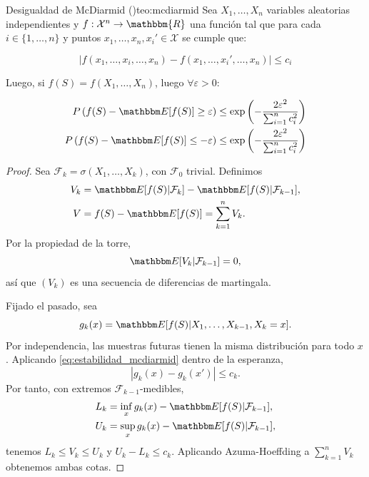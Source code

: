 \begin{theorem}{Desigualdad de McDiarmid (\cite{mcdiarmid1989method})}{teo:mcdiarmid}
	Sea \(X_1, \ldots, X_n\) variables aleatorias independientes y \(f: \mathcal{X}^n \to \mathbbm{R}\) una función tal que para cada \(i \in \{1, \ldots, n\}\) y
	puntos \(x_1, \ldots, x_n, x_i' \in \mathcal{X}\) se cumple que:

	\begin{equation}\label{eq:estabilidad_mcdiarmid}
		\left| f(x_1, \ldots, x_i, \ldots, x_n) - f(x_1, \ldots, x_i', \ldots, x_n) \right| \leq c_i
	\end{equation}

	Luego, si \(f(S) = f(X_1, \ldots, X_n)\), luego \(\forall \varepsilon > 0\):

	\begin{align}
		P\left( f(S) - \E{f(S)} \geq \varepsilon \right)  & \leq \exp\left( -\frac{2\varepsilon^2}{\sum_{i=1}^n c_i^2} \right) \\
		P\left( f(S) - \E{f(S)} \leq -\varepsilon \right) & \leq \exp\left( -\frac{2\varepsilon^2}{\sum_{i=1}^n c_i^2} \right)
	\end{align}

\end{theorem}

\begin{proof}
    Sea \(\mathcal F_k=\sigma(X_1,\ldots,X_k)\), con \(\mathcal F_0\) trivial. Definimos
    \begin{align}
        V_k &= \E{f(S)|\mathcal F_k}-\E{f(S)|\mathcal F_{k-1}},\\
        V &= f(S)-\E{f(S)}=\sum_{k=1}^n V_k.
    \end{align}
    Por la propiedad de la torre,
    \[
        \E{V_k|\mathcal F_{k-1}}=0,
    \]
    así que \((V_k)\) es una secuencia de diferencias de martingala.

    Fijado el pasado, sea
    \[
        g_k(x)=\E{f(S)|X_1,\ldots,X_{k-1},X_k=x}.
    \]
    Por independencia, las muestras futuras tienen la misma distribución para todo \(x\). Aplicando \eqref{eq:estabilidad_mcdiarmid} dentro de la esperanza,
    \[
        |g_k(x)-g_k(x')|\leq c_k.
    \]
    Por tanto, con extremos \(\mathcal F_{k-1}\)-medibles,
    \begin{align*}
        L_k&=\inf_x g_k(x)-\E{f(S)|\mathcal F_{k-1}},\\
        U_k&=\sup_x g_k(x)-\E{f(S)|\mathcal F_{k-1}},
    \end{align*}
    tenemos \(L_k\leq V_k\leq U_k\) y \(U_k-L_k\leq c_k\). Aplicando Azuma-Hoeffding a \(\sum_{k=1}^n V_k\) obtenemos ambas cotas. \qedhere
\end{proof}
